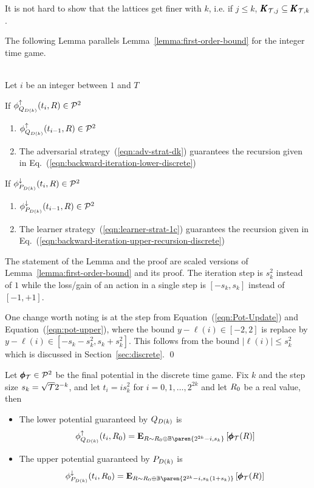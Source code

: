 \documentclass{article}[12pt]
\begin{document}
It is not hard to show that the lattices get finer with $k$, i.e. if  $j \leq k$,  $\pmb{K}_{\mathcal{T},j} \subseteq \pmb{K}_{\mathcal{T},k}$.


The following Lemma parallels Lemma~\ref{lemma:first-order-bound} for the integer time game.
\begin{lemma} \label{lemma:discrete-step-bound}
~\\
Let $i$ be an integer between $1$ and $T$

If $\phi_{Q_{D(k)}}^{\uparrow}(t_i,R) \in {\cal P}^{2}$
\begin{enumerate}
\item  $\phi_{Q_{D(k)}}^{\uparrow}(t_{i-1},R) \in {\cal P}^{2}$
\item The adversarial strategy~(\ref{eqn:adv-strat-dk})
  guarantees the recursion given in Eq.~(\ref{eqn:backward-iteration-lower-discrete})
\end{enumerate}

If $\phi_{P_{D(k)}}^{\downarrow}(t_i,R) \in {\cal P}^{2}$
\begin{enumerate}
\item $\phi_{P_{D(k)}}^{\downarrow}(t_{i-1},R) \in {\cal P}^{2}$
\item The learner strategy~(\ref{eqn:learner-strat-1c})
  guarantees the recursion given in Eq.~(\ref{eqn:backward-iteration-upper-recursion-discrete})
\end{enumerate}

\end{lemma}
\proof
The statement of the Lemma and the proof are scaled versions of
Lemma~\ref{lemma:first-order-bound} and its proof. The iteration step
is $s_k^2$ instead of $1$ while the loss/gain of an action in a single
step is $[-s_k,s_k]$ instead of $[-1,+1]$.

One change worth noting is at the step from
Equation~(\ref{eqn:Pot-Update}) and Equation~(\ref{eqn:pot-upper}),
where the bound  $y-\ell(i) \in [-2,2]$ is replace by  $y-\ell(i) \in
[-s_k-s_k^2,s_k+s_k^2]$. This follows from the bound $|\ell(i)| \leq
s_k^2$ which is discussed in Section~\ref{sec:discrete}.
\qed

\begin{theorem} \label{thm:DescreteGameExactValues}
  Let $\pmb{\phi}_{\mathcal{T}} \in {\cal P}^{2}$ be the final potential in the discrete
  time game. Fix $k$ and the step size $s_k=\sqrt{\mathcal{T}} 2^{-k}$, and let $t_i=i s_k^2$ for $i=0,1,\ldots,2^{2k}$ and
  let $R_0$ be a real value, then 
  \begin{itemize}
  \item
    The lower potential guaranteed by $Q_{D(k)}$ is
    \begin{equation} \label{eqn:lower-potential-exact}
      \lowerpotMdk(t_i,\R_0) = \E{\R \sim \R_0 \oplus
        \Binom\paren{2^{2k}-i,s_k}}{\finalPotR(\R)}
      \end{equation}
  \item
    The upper potential guaranteed by $P_{D(k)}$ is
    \begin{equation} \label{eqn:upper-potential-exact}
    \upperpotMdk(t_i,\R_0) =  \E{\R \sim \R_0 \oplus
      \Binom\paren{2^{2k}-i,s_k(1+s_k)}}{\finalPotR(\R)}
    \end{equation}
  \end{itemize}
\end{theorem}
\end{document}
